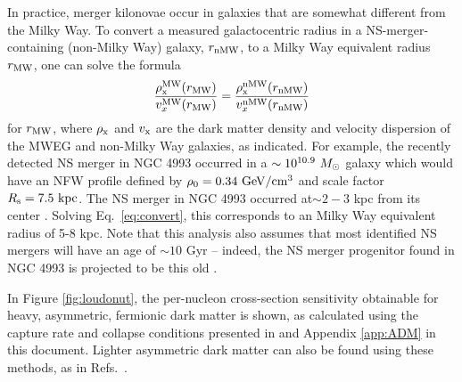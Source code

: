 \documentclass[nofootinbib,longbibliography,prd,floatfix,superscriptaddress,twocolumn]{revtex4-1}
\begin{document}
In practice, merger kilonovae occur in galaxies that are somewhat different from the Milky Way. To convert a measured galactocentric radius in a NS-merger-containing (non-Milky Way) galaxy, $r_{\rm nMW}$, to a Milky Way equivalent radius $r_{\rm MW}$, one can solve the formula
\begin{align}
\frac{\rho_{\rm x}^{\rm MW}({r_{\rm MW}})}{v_{x \rm}^{\rm MW}({r_{\rm MW}})} = \frac{\rho_{\rm x}^{\rm nMW}({r_{\rm nMW}})}{v_{x \rm}^{\rm nMW}({r_{\rm nMW}})}
\label{eq:convert}
\end{align}
for $r_{\rm MW}$, where $\rho_{\rm x}$ and $v_{\rm x}$ are the dark matter density and velocity dispersion of the MWEG and non-Milky Way galaxies, as indicated. For example, the recently detected NS merger in NGC 4993 occurred in a $\sim 10^{10.9} ~M_{\rm \odot}$ galaxy which would have an NFW profile defined by $\rho_0 = 0.34 ~{\rm GeV/cm^3}$ and scale factor $R_{\rm s}=7.5~{\rm kpc}$. The NS merger in NGC 4993 occurred at$ \sim 2-3$ kpc from its center \cite{GBM:2017lvd}. Solving Eq.~\eqref{eq:convert}, this corresponds to an Milky Way equivalent radius of 5-8 kpc. Note that this analysis also assumes that most identified NS mergers will have an age of $\sim 10$ Gyr -- indeed, the NS merger progenitor found in NGC 4993 is projected to be this old \cite{Blanchard:2017csd}.

In Figure \ref{fig:loudonut}, the per-nucleon cross-section sensitivity obtainable for heavy, asymmetric, fermionic dark matter is shown, as calculated using the capture rate and collapse conditions presented in \cite{Bramante:2017xlb,Bramante:2015cua} and Appendix \ref{app:ADM} in this document. Lighter asymmetric dark matter can also be found using these methods, as in Refs.~\cite{Bramante:2014zca,Bramante:2015dfa,Goldman:1989nd,deLavallaz:2010wp,Kouvaris:2010jy,McDermott:2011jp,Bramante:2013hn,Bell:2013xk,
Bertoni:2013bsa,Guver:2012ba,Kouvaris:2013kra,Kurita:2015vga}.
\end{document}
